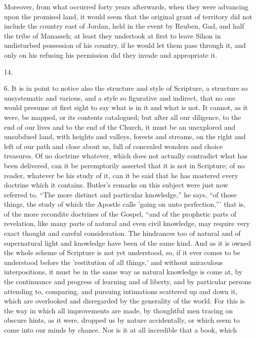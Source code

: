Moreover, from what occurred forty years afterwards,
when they were advancing upon the promised land, it would
seem that the original grant of territory did not include
the country east of Jordan, held in the event by Reuben,
Gad, and half the tribe of Manasseh; at least they
undertook at first to leave Sihon in undisturbed
possession of his country, if he would let them pass
through it, and only on his refusing his permission did
they invade and appropriate it.

14.

6. It is in point to notice also the structure and
style of Scripture, a structure so unsystematic and
various, and a style so figurative and indirect, that no
one would presume at first sight to say what is in it and
what is not. It cannot, as it were, be mapped, or its
contents catalogued; but after all our diligence, to the
end of our lives and to the end of the Church, it must be
an unexplored and unsubdued land, with heights and
valleys, forests and streams, on the right and left of
our path and close about us, full of concealed wonders
and choice treasures. Of no doctrine whatever, which does
not actually contradict what has been delivered, can it
be peremptorily asserted that it is not in Scripture; of
no reader, whatever be his study of it, can it be said
that he has mastered every doctrine which it contains.
Butler's remarks on this subject were just now referred
to. ``The more distinct and particular
knowledge,'' he says, ``of those things, the
study of which the Apostle calls 'going on unto
perfection,''' that is, of the more recondite
doctrines of the Gospel, ``and of the prophetic parts
of revelation, like many parts of natural and even civil
knowledge, may require very exact thought and careful
consideration. The hindrances too of natural and of
supernatural light and knowledge have been of the same
kind. And as it is owned the whole scheme of Scripture is
not yet understood, so, if it ever comes to be understood
before the 'restitution of all things,' and without
miraculous interpositions, it must be in the same way as
natural knowledge is come at, by the continuance and
progress of learning and of liberty, and by particular
persons attending to, comparing, and pursuing intimations
scattered up and down it, which are overlooked and
disregarded by the generality of the world. For this is
the way in which all improvements are made, by thoughtful
men tracing on obscure hints, as it were, dropped us by
nature accidentally, or which seem to come into our minds
by chance. Nor is it at all incredible that a book, which

